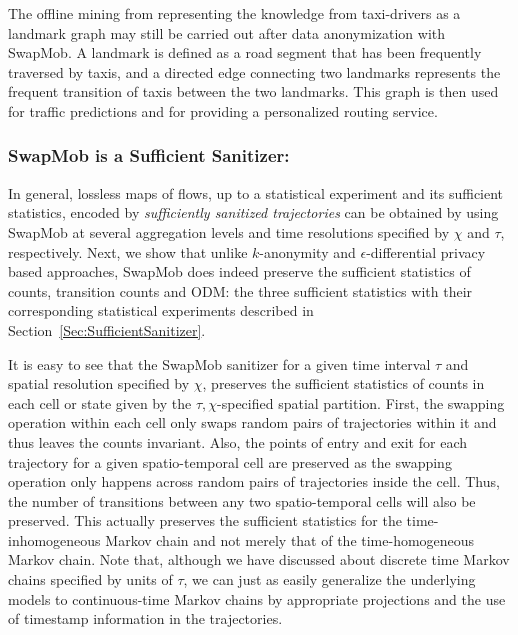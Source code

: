 \documentclass[times,twocolumn,final,authoryear]{elsarticle}
\begin{document}
The offline mining from \cite{Yuan2011} representing the knowledge from taxi-drivers as a landmark graph may still be carried out after data anonymization with SwapMob. 
A landmark is defined as a road segment that has been frequently traversed by taxis, and a directed edge connecting two landmarks represents the frequent transition of taxis between the two landmarks. This graph is then used for traffic predictions and for providing a personalized routing service.

\subsubsection{SwapMob is a Sufficient Sanitizer:}

In general, lossless maps of flows, up to a statistical experiment and its sufficient statistics, encoded by {\em sufficiently sanitized trajectories} can be obtained by using SwapMob at several aggregation levels and time resolutions specified by $\chi$ and $\tau$, respectively.  
Next, we show that unlike $k$-anonymity and $\epsilon$-differential privacy based approaches, SwapMob does indeed preserve the sufficient statistics of counts, transition counts and ODM: the three sufficient statistics with their corresponding statistical experiments described in Section~\ref{Sec:SufficientSanitizer}.

It is easy to see that the SwapMob sanitizer for a given time interval $\tau$ and spatial resolution specified by $\chi$, preserves the sufficient statistics of counts in each cell or state given by the $\tau,\chi$-specified spatial partition.  
First, the swapping operation within each cell only swaps random pairs of trajectories within it and thus leaves the counts invariant.  
Also, the points of entry and exit for each trajectory for a given spatio-temporal cell are preserved as the swapping operation only happens across random pairs of trajectories inside the cell.  
Thus, the number of transitions between any two spatio-temporal cells will also be preserved.  
This actually preserves the sufficient statistics for the time-inhomogeneous Markov chain and not merely that of the time-homogeneous Markov chain. 
Note that, although we have discussed about discrete time Markov chains specified by units of $\tau$, we can just as easily generalize the underlying models to continuous-time Markov chains by appropriate projections and the use of timestamp information in the trajectories.   
\end{document}
